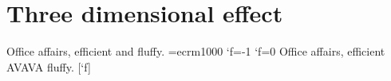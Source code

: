 \documentclass{amsart}
\begin{document}
\section{Three dimensional effect}
Office affairs, efficient and fluffy.
\font\tg=ecrm1000 \tagcode\tg`f=-1 \tagcode\tg`f=0
{\tg Office affairs, efficient AVAVA fluffy.} [\the\tagcode\tg`f]
\end{document}
